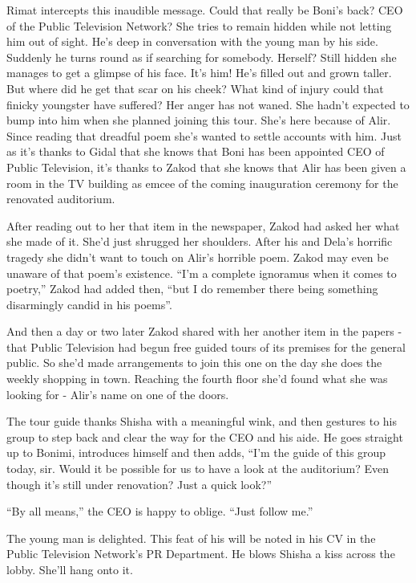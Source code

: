 \documentclass[twoside,11pt]{book}
\begin{document}
Rimat intercepts this inaudible message. Could that really be Boni's back? CEO of the Public Television Network? She
tries to remain hidden while not letting him out of sight. He's deep in conversation with the young man by his side.
Suddenly he turns round as if searching for somebody. Herself? Still hidden she manages to get a glimpse of his face.
It's him! He's filled out and grown taller. But where did he get that scar on his cheek? What kind of injury could that
finicky youngster have suffered? Her anger has not waned. She hadn't expected to bump into him when she planned joining
this tour. She's here because of Alir. Since reading that dreadful
poem she's wanted to settle accounts with him. Just as it's thanks to Gidal that she knows that Boni has been appointed
CEO of Public Television, it's thanks to Zakod that she knows that Alir has been given a room in the TV building as
emcee of the
coming inauguration ceremony for the renovated auditorium.

After reading out to her that item in the newspaper, Zakod had asked her what she made of it. She'd just shrugged her
shoulders. After his and Dela's horrific tragedy she didn't want to touch on Alir's horrible poem. Zakod may even be
unaware of that poem's existence. ``I'm a complete ignoramus when it comes to poetry,'' Zakod
had added then, ``but  I do remember there being something disarmingly candid in his poems''.


And then a day or two later Zakod shared with her another item in the papers - that  Public Television had begun free
guided tours of its premises for the general public. So she'd made arrangements to join this one on the day she does
the weekly shopping in town. Reaching the fourth floor she'd found what she was looking for - Alir's name on one of the
doors.

The tour guide thanks Shisha with a meaningful wink, and then gestures to his group to step back and clear the way for
the CEO and his aide. He goes straight up to Bonimi, introduces himself and then adds, ``I'm the guide of
this group today, sir. Would it be possible for us to have a look at the auditorium? Even though it's still under
renovation? Just a quick look?''

``By all means,'' the CEO is happy to oblige. ``Just follow me.''

The young man is delighted. This feat of his will be noted in his CV in the Public Television Network's PR Department.
He blows Shisha a kiss across the lobby. She'll hang onto it.
\end{document}
